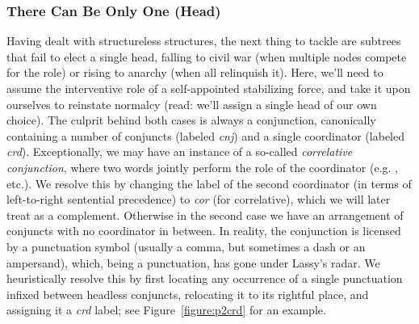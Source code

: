 \subsubsection{There Can Be Only One (Head)}
Having dealt with structureless structures, the next thing to tackle are subtrees that fail to elect a single head, falling to civil war (when multiple nodes compete for the role) or rising to anarchy (when all relinquish it).
Here, we'll need to assume the interventive role of a self-appointed stabilizing force, and take it upon ourselves to reinstate normalcy (read: we'll assign a single head of our own choice).
The culprit behind both cases is always a conjunction, canonically containing a number of conjuncts (labeled \textit{cnj}) and a single coordinator (labeled \textit{crd}).
Exceptionally, we may have an instance of a so-called \textit{correlative conjunction}, where two words jointly perform the role of the coordinator (e.g. , etc.).
We resolve this by changing the label of the second coordinator (in terms of left-to-right sentential precedence) to \textit{cor} (for correlative), which we will later treat as a complement.
Otherwise in the second case we have an arrangement of conjuncts with no coordinator in between.
In reality, the conjunction is licensed by a punctuation symbol (usually a comma, but sometimes a dash or an ampersand), which, being a punctuation, has gone under Lassy's radar.
We heuristically resolve this by first locating any occurrence of a single punctuation infixed between headless conjuncts, relocating it to its rightful place, and assigning it a \textit{crd} label; see Figure~\ref{figure:p2crd} for an example.

